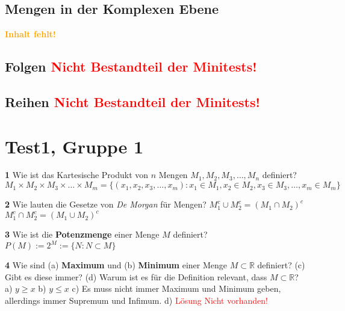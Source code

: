 \documentclass[11pt]{article}
\begin{document}
    \subsection{Mengen in der Komplexen Ebene}
    \textcolor{orange}{\textbf{Inhalt fehlt!}}

    \subsection{Folgen \textcolor{red}{\textbf{Nicht Bestandteil der Minitests!}}}

    \subsection{Reihen \textcolor{red}{\textbf{Nicht Bestandteil der Minitests!}}}

\section{Test1, Gruppe 1}

    \textbf{1} Wie ist das Kartesische Produkt von $n$ Mengen $M_1, M_2, M_3, \dots, M_n$ definiert?\newline
    $M_1 \times M_2 \times M_3 \times \ldots \times M_m = \{ (x_1, x_2, x_3, \ldots, x_m) : x_1 \in M_1, x_2 \in M_2, x_3 \in M_3, \ldots, x_m \in M_m \}$\newline

    \textbf{2} Wie lauten die Gesetze von {\itshape De Morgan} für Mengen?\newline
    $M_1^c \cup M_2^c = (M_1 \cap M_2)^c$\newline
    $M_1^c \cap M_2^c = (M_1 \cup M_2)^c$\newline


    \textbf{3} Wie ist die \textbf{Potenzmenge} einer Menge $M$ definiert?\newline
    $P(M) := 2^M := \{ N : N \subset M \}$\newline

    \textbf{4} Wie sind (a) \textbf{Maximum} und (b) \textbf{Minimum} einer Menge $M \subset \mathbb{R}$ definiert? (c) Gibt es diese immer? (d) Warum ist es für die Definition relevant, dass $M \subset \mathbb{R}$?\newline
    a) $y \geq x$\newline
    b) $y \leq x$\newline
    c) Es muss nicht immer Maximum und Minimum geben, allerdings immer Supremum und Infimum.\newline
    d) \textcolor{red}{Lösung Nicht vorhanden!}\newline
\end{document}

